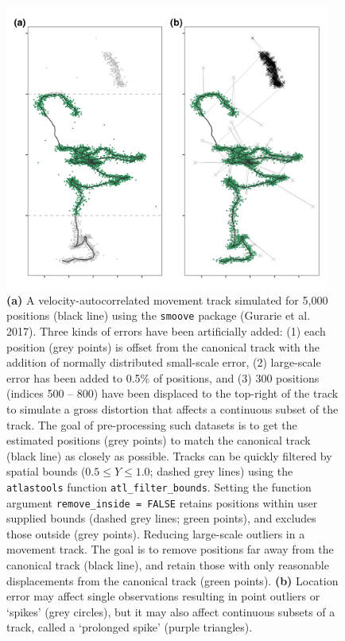 \documentclass[10pt,paper=a4,headings=standardclasses
]{scrartcl}
\begin{document}
\begin{figure}[h!]
    \centering
    \includegraphics[width=0.95\textwidth]{figures/fig_02_filtering_data.png}
    \caption{\textbf{(a)} A velocity-autocorrelated movement track simulated for 5,000 positions (black line) using the \texttt{smoove} package (Gurarie et al. 2017). Three kinds of errors have been artificially added: (1) each position (grey points) is offset from the canonical track with the addition of normally distributed small-scale error, (2) large-scale error has been added to 0.5\% of positions, and (3) 300 positions (indices 500 -- 800) have been displaced to the top-right of the track to simulate a gross distortion that affects a continuous subset of the track. 
    The goal of pre-processing such datasets is to get the estimated positions (grey points) to match the canonical track (black line) as closely as possible.  
    Tracks can be quickly filtered by spatial bounds ($0.5 \leq Y \leq 1.0$; dashed grey lines) using the \texttt{atlastools} function  \texttt{atl\_filter\_bounds}.
    Setting the function argument \texttt{remove\_inside = FALSE} retains positions within user supplied bounds (dashed grey lines; green points), and excludes those outside (grey points).
    Reducing large-scale outliers in a movement track. The goal is to remove positions far away from the canonical track (black line), and retain those with only reasonable displacements from the canonical track (green points). 
    \textbf{(b)} Location error may affect single observations resulting in point outliers or `spikes' (grey circles), but it may also affect continuous subsets of a track, called a `prolonged spike' (purple triangles). 
}
\end{figure}
\end{document}
